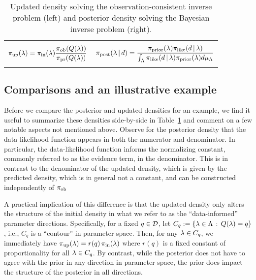 \begin{table}[htbp]
\centering
\begin{tabular}{|c|c|}
\hline
 & \\
$\displaystyle \operatorname*{\pi_{up}}(\lambda) = \operatorname*{\pi_{in}}(\lambda) \frac{\operatorname*{\pi_{ob}}(Q(\lambda))}{\operatorname*{\pi_{pr}}(Q(\lambda))}
$
&
$
	\displaystyle \pi_{\text{post}}(\lambda\,|\,d) = \frac{\pi_{\text{prior}}(\lambda)\pi_\text{like}(d\,|\,\lambda)}{\int_{\Lambda} \pi_\text{like}(d\, |\, \lambda)  \pi_{\text{prior}}(\lambda) d\mu_{{\Lambda}}}
$
 \\ & \\ \hline
\end{tabular}
\caption{Updated density solving the observation-consistent inverse problem (left) and posterior density solving the Bayesian inverse problem (right).}
		\label{tab:dens_comparisons}
\end{table}

\subsection{Comparisons and an illustrative example}

Before we compare the posterior and updated densities for an example, we find it useful to summarize these densities side-by-side in Table~\ref{tab:dens_comparisons} and comment on a few notable aspects not mentioned above.
Observe for the posterior density that the data-likelihood function appears in both the numerator and denominator.
In particular, the data-likelihood function informs the {normalizing constant}, commonly referred to as the evidence term, in the denominator.
This is in contrast to the denominator of the updated density, which is given by the predicted density, which is in general not a constant, and can be constructed independently of $\operatorname*{\pi_{ob}}$

A practical implication of this difference is that the updated density only alters the structure of the initial density in what we refer to as the ``data-informed'' parameter directions.
Specifically, for a fixed $q\in\mathcal{D}$, let $C_q := \left\{\lambda\in{\Lambda}\, : \, Q(\lambda)=q\right\}$, i.e., $C_q$ is a ``contour'' in parameter space.
Then, for any $\lambda\in C_q$, we immediately have $\operatorname*{\pi_{up}}(\lambda)=r(q)\operatorname*{\pi_{in}}(\lambda)$ where $r(q)$ is a fixed constant of proportionality for all $\lambda\in C_q$.
By contrast, while the posterior does not have to agree with the prior in any direction in parameter space, the prior does impact the structure of the posterior in all directions.


